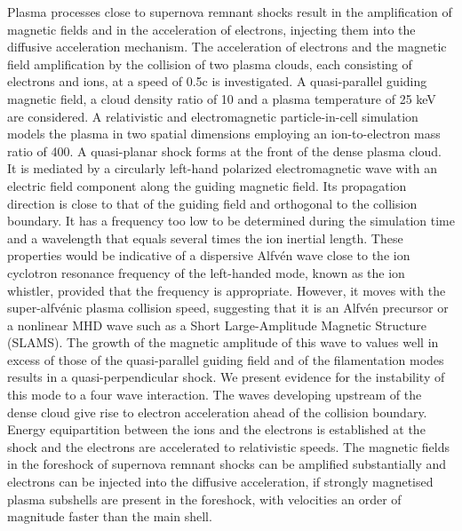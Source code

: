 \documentclass[structabstract]{aa}
\begin{document}
\abstract
{Plasma processes close to supernova remnant shocks result in the
amplification of magnetic fields and in the acceleration of electrons, 
injecting them into the diffusive acceleration mechanism.}
{The acceleration of electrons and the magnetic field amplification by
the collision of two plasma clouds, each consisting of electrons and
ions, at a speed of 0.5c is investigated. A quasi-parallel guiding magnetic 
field, a cloud density ratio of 10 and a plasma temperature of 25 keV
are considered.}
{A relativistic and electromagnetic particle-in-cell simulation models 
the plasma in two spatial dimensions employing an ion-to-electron 
mass ratio of 400.}
{A quasi-planar shock forms at the front of the dense plasma cloud. It is 
mediated by a circularly left-hand polarized electromagnetic wave with an 
electric field component along the guiding magnetic field. Its propagation
direction is close to that of the guiding field and orthogonal to the 
collision boundary. It has a frequency too low to be determined during
the simulation time and a wavelength that equals several times the ion 
inertial length. These properties would be indicative of a dispersive 
Alfv\'en wave close to the ion cyclotron resonance frequency of the left-handed 
mode, known as the ion whistler, provided that the frequency is appropriate. 
However, it moves with the super-alfv\'enic plasma collision speed, suggesting 
that it is an Alfv\'en precursor or a nonlinear MHD wave such as 
a Short Large-Amplitude Magnetic Structure (SLAMS). The growth of the magnetic 
amplitude of this wave to values well in excess of those of the quasi-parallel 
guiding field and of the filamentation modes results in a quasi-perpendicular 
shock. We present evidence for the instability of this mode to a four 
wave interaction. The waves developing upstream of the dense cloud give rise 
to electron acceleration ahead of the collision boundary. Energy 
equipartition between the ions and the electrons is established at the shock 
and the electrons are accelerated to relativistic speeds.}
{The magnetic fields in the foreshock of supernova remnant shocks can be 
amplified substantially and electrons can be injected into the diffusive 
acceleration, if strongly magnetised plasma subshells are present in the 
foreshock, with velocities an order of magnitude faster than the main shell.}


   \maketitle
%
\end{document}
